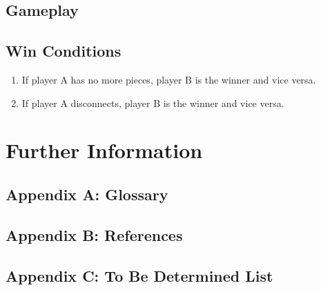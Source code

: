 \documentclass{scrreprt}
\begin{document}
\section{Gameplay}

\section{Win Conditions}

\begin{enumerate}
    \item If player A has no more pieces, player B is the winner and vice versa.
    \item If player A disconnects, player B is the winner and vice versa.
\end{enumerate}

\chapter{Further Information}

\section{Appendix A: Glossary}

\section{Appendix B: References}


{}


\section{Appendix C: To Be Determined List}
\end{document}
